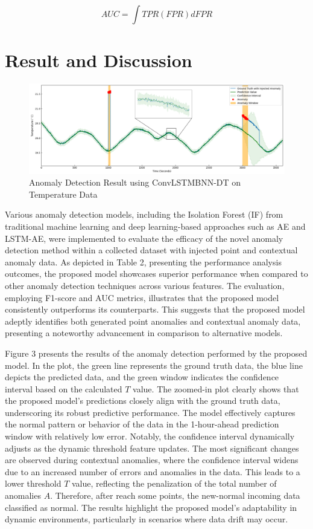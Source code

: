\documentclass[final,3p,times,twocolumn]{elsarticle}
\begin{document}
\begin{equation}\label{eq4}
AUC = \int TPR(FPR) dFPR
\end{equation}

\section{Result and Discussion}\label{sec4}
\begin{figure}[t]
	\centering
	\includegraphics[width=15cm]{Anomaly} 
	\caption[width=0.5\paperwidth]{Anomaly Detection Result using ConvLSTMBNN-DT on Temperature Data}\label{fig:Anomaly}
\end{figure}

Various anomaly detection models, including the Isolation Forest (IF) from traditional machine learning and deep learning-based approaches such as AE and LSTM-AE, were implemented to evaluate the efficacy of the novel anomaly detection method within a collected dataset with injected point and contextual anomaly data. As depicted in Table 2, presenting the performance analysis outcomes, the proposed model showcases superior performance when compared to other anomaly detection techniques across various features. The evaluation, employing F1-score and AUC metrics, illustrates that the proposed model consistently outperforms its counterparts. This suggests that the proposed model adeptly identifies both generated point anomalies and contextual anomaly data, presenting a noteworthy advancement in comparison to alternative models.

Figure 3 presents the results of the anomaly detection performed by the proposed model. In the plot, the green line represents the ground truth data, the blue line depicts the predicted data, and the green window indicates the confidence interval based on the calculated $T$ value. The zoomed-in plot clearly shows that the proposed model's predictions closely align with the ground truth data, underscoring its robust predictive performance. The model effectively captures the normal pattern or behavior of the data in the 1-hour-ahead prediction window with relatively low error. Notably, the confidence interval dynamically adjusts as the dynamic threshold feature updates. The most significant changes are observed during contextual anomalies, where the confidence interval widens due to an increased number of errors and anomalies in the data. This leads to a lower threshold $T$ value, reflecting the penalization of the total number of anomalies $A$. Therefore, after reach some points, the new-normal incoming data classified as normal.  The results highlight the proposed model's adaptability in dynamic environments, particularly in scenarios where data drift may occur.
\end{document}
